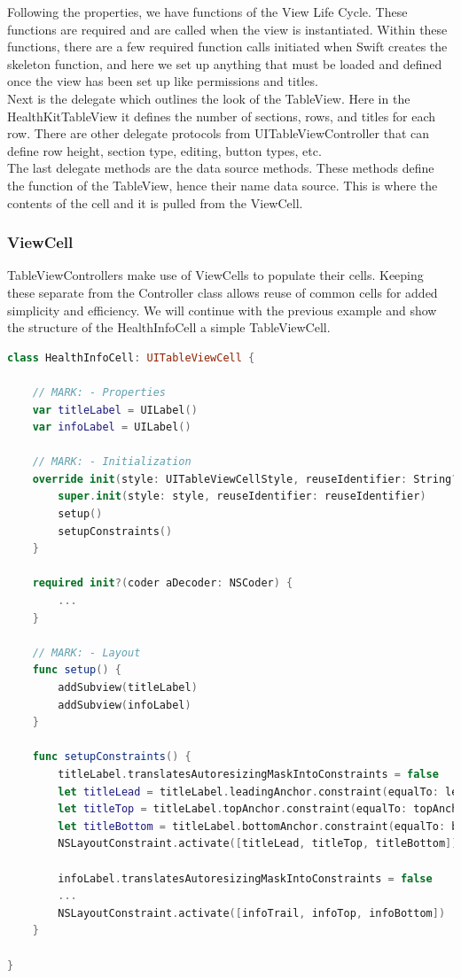 Following the properties, we have functions of the View Life Cycle. These functions are required and are called when the view is instantiated. Within these functions, there are a few required function calls initiated when Swift creates the skeleton function, and here we set up anything that must be loaded and defined once the view has been set up like permissions and titles. \\

Next is the delegate which outlines the look of the TableView. Here in the HealthKitTableView it defines the number of sections, rows, and titles for each row. There are other delegate protocols from UITableViewController that can define row height, section type, editing, button types, etc. \\

The last delegate methods are the data source methods. These methods define the function of the TableView, hence their name data source. This is where the contents of the cell and it is pulled from the ViewCell.

\subsubsection{ViewCell}
TableViewControllers make use of ViewCells to populate their cells. Keeping these separate from the Controller class allows reuse of common cells for added simplicity and efficiency. We will continue with the previous example and show the structure of the HealthInfoCell a simple TableViewCell.

\begin{lstlisting}[language=Swift]
class HealthInfoCell: UITableViewCell {

    // MARK: - Properties
    var titleLabel = UILabel()
    var infoLabel = UILabel()

    // MARK: - Initialization
    override init(style: UITableViewCellStyle, reuseIdentifier: String?) {
        super.init(style: style, reuseIdentifier: reuseIdentifier)
        setup()
        setupConstraints()
    }

    required init?(coder aDecoder: NSCoder) {
    	...
    }

    // MARK: - Layout
    func setup() {
        addSubview(titleLabel)
        addSubview(infoLabel)
    }

    func setupConstraints() {
        titleLabel.translatesAutoresizingMaskIntoConstraints = false
        let titleLead = titleLabel.leadingAnchor.constraint(equalTo: leadingAnchor, constant: 10)
        let titleTop = titleLabel.topAnchor.constraint(equalTo: topAnchor, constant: 10)
        let titleBottom = titleLabel.bottomAnchor.constraint(equalTo: bottomAnchor, constant: -10)
        NSLayoutConstraint.activate([titleLead, titleTop, titleBottom])

        infoLabel.translatesAutoresizingMaskIntoConstraints = false
  		...
        NSLayoutConstraint.activate([infoTrail, infoTop, infoBottom])
    }

}
\end{lstlisting}


